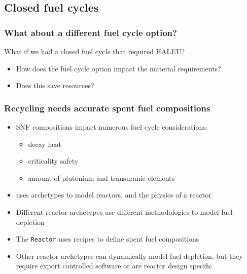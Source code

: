 \subsection{Closed fuel cycles}
\begin{frame}
    \frametitle{What about a different fuel cycle option?}
    What if we had a closed fuel cycle that required \gls{HALEU}?
    \begin{itemize}
        \item How does the fuel cycle option impact the material requirements?
        \item Does this save resources?
    \end{itemize}

\end{frame}

\begin{frame}
    \frametitle{Recycling needs accurate spent fuel compositions}
    \begin{itemize}
    \item \Gls{SNF} compositions impact numerous fuel cycle considerations:
    \begin{itemize}
        \item decay heat
        \item criticality safety
        \item amount of plutonium and transuranic elements
    \end{itemize}
    \item<2-> \Cyclus uses archetypes to model reactors, and the physics 
         of a reactor
    \item<2-> Different reactor archetypes use different methodologies 
         to model fuel depletion
    \item<3-> The \Cycamore \texttt{Reactor} uses recipes to define spent fuel compositions
    \item<3-> Other \Cyclus reactor archetypes can dynamically model 
          fuel depletion, but they require export controlled software 
          or are reactor design specific
\end{itemize}
\end{frame}

